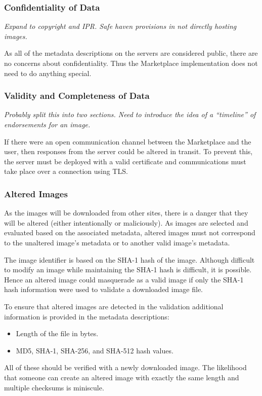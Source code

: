 \subsubsection{Confidentiality of Data}

{\em Expand to copyright and IPR.  Safe haven provisions in not
  directly hosting images.}

As all of the metadata descriptions on the servers are considered
public, there are no concerns about confidentiality.  Thus the
Marketplace implementation does not need to do anything special.

\subsubsection{Validity and Completeness of Data}

{\em Probably split this into two sections.  Need to introduce the
  idea of a ``timeline'' of endorsements for an image.}

If there were an open communication channel between the Marketplace
and the user, then responses from the server could be altered in
transit.  To prevent this, the server must be deployed with a valid
certificate and communications must take place over a connection using
TLS\@.

\subsubsection{Altered Images}

As the images will be downloaded from other sites, there is a danger
that they will be altered (either intentionally or maliciously).  As
images are selected and evaluated based on the associated metadata,
altered images must not correspond to the unaltered image's metadata
or to another valid image's metadata.

The image identifier is based on the SHA-1 hash of the image.
Although difficult to modify an image while maintaining the SHA-1 hash
is difficult, it is possible.  Hence an altered image could masquerade
as a valid image if only the SHA-1 hash information were used to
validate a downloaded image file.

To ensure that altered images are detected in the validation
additional information is provided in the metadata descriptions:
\begin{itemize}
\item Length of the file in bytes.
\item MD5, SHA-1, SHA-256, and SHA-512 hash values.
\end{itemize}
All of these should be verified with a newly downloaded image.  The
likelihood that someone can create an altered image with exactly the
same length and multiple checksums is miniscule.

